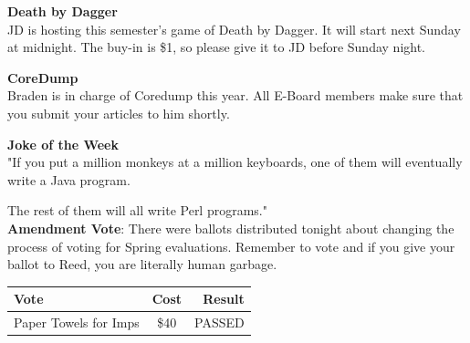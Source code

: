 \documentclass[9pt]{extarticle} %
\begin{document}
\begin{minipage}[t]{.40\linewidth}
\begin{mdframed}[style=sidebar,frametitle={}]

\textbf{Death by Dagger} \\
JD is hosting this semester's game of Death by Dagger. It will start next Sunday at midnight. The buy-in is \$1, so please give it to JD before Sunday night.

\textbf{CoreDump} \\
Braden is in charge of Coredump this year. All E-Board members make sure that you submit your articles to him shortly.


\textbf{Joke of the Week} \\
"If you put a million monkeys at a million keyboards, one of them will eventually write a Java program.

The rest of them will all write Perl programs."
\\

\textbf{Amendment Vote}:
There were ballots distributed tonight about changing the process of voting for Spring evaluations. Remember to vote and if you give your ballot to Reed, you are literally human garbage.
\\

\begin{tabular}{lcr}

Vote & Cost & Result \\
\midrule
Paper Towels for Imps & \$40 & PASSED \\
\bottomrule
\end{tabular}


\end{mdframed}
\end{minipage}\hfill %
%
%
\end{document}

